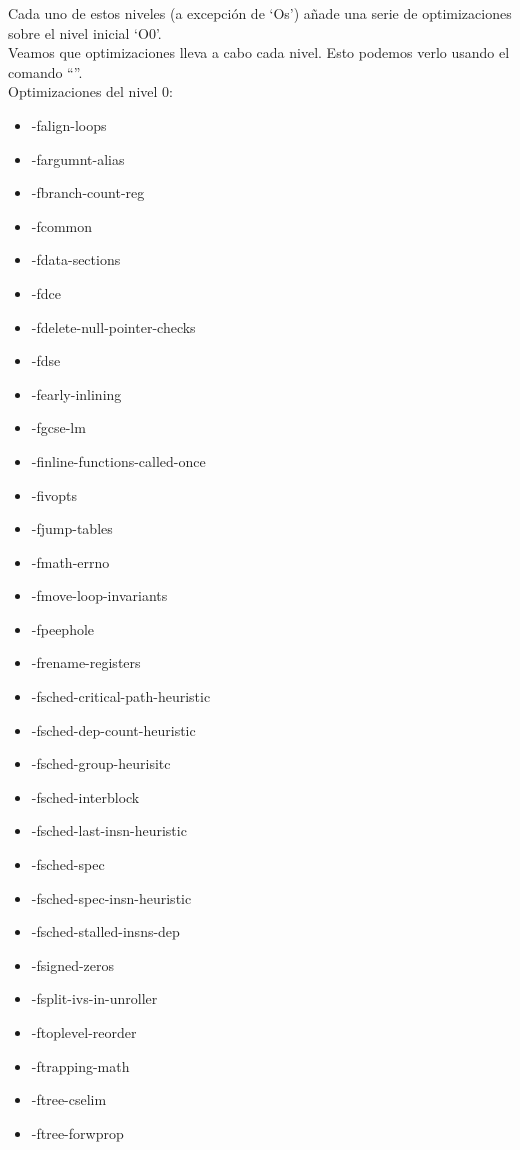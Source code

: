 Cada uno de estos niveles (a excepción de `Os') añade una serie de optimizaciones sobre el nivel inicial `O0'.\\
Veamos que optimizaciones lleva a cabo cada nivel. Esto podemos verlo usando el comando ``''.\\
\newline
Optimizaciones del nivel 0:
\begin{multicols}{2}
\begin{itemize}[noitemsep, topsep=0pt, parsep=0pt, partopsep=0pt]
	\item -falign-loops
	\item -fargumnt-alias
	\item -fbranch-count-reg
	\item -fcommon
	\item -fdata-sections
	\item -fdce
	\item -fdelete-null-pointer-checks
	\item -fdse
	\item -fearly-inlining
	\item -fgcse-lm
	\item -finline-functions-called-once
	\item -fivopts
	\item -fjump-tables
	\item -fmath-errno
	\item -fmove-loop-invariants
	\item -fpeephole
	\item -frename-registers
	\item -fsched-critical-path-heuristic
	\item -fsched-dep-count-heuristic
	\item -fsched-group-heurisitc
	\item -fsched-interblock
	\item -fsched-last-insn-heuristic
	\item -fsched-spec
	\item -fsched-spec-insn-heuristic
	\item -fsched-stalled-insns-dep
	\item -fsigned-zeros
	\item -fsplit-ivs-in-unroller
	\item -ftoplevel-reorder
	\item -ftrapping-math
	\item -ftree-cselim
	\item -ftree-forwprop

\end{itemize}
\end{multicols}
